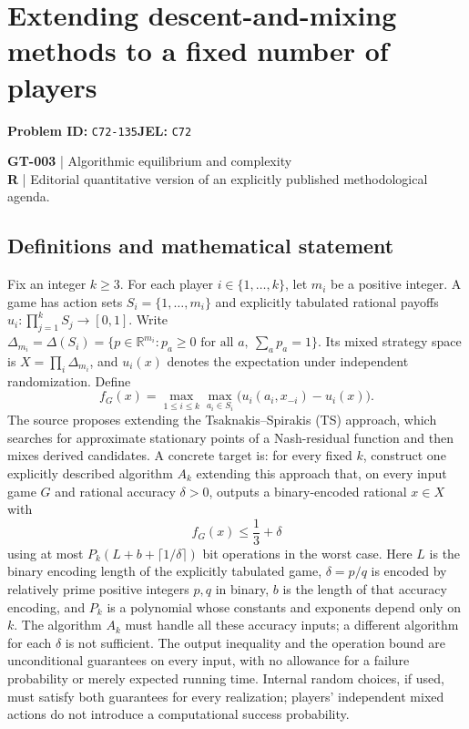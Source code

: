 \documentclass[11pt,a4paper]{article}
\newcommand{\R}{\mathbb R}
\begin{document}
\section*{Extending descent-and-mixing methods to a fixed number of players}
\textbf{Problem ID:} \texttt{C72-135}\quad \textbf{JEL:} \texttt{C72}\par
\label{problem:OP-0133}
\label{game:GT-003}
{\sffamily\small\color{muted}
\textbf{GT-003} | Algorithmic equilibrium and complexity\\
\textbf{R} | Editorial quantitative version of an explicitly published methodological agenda.
\par}
\subsection*{Definitions and mathematical statement}
Fix an integer $k\geq3$. For each player $i\in\{1,\ldots,k\}$, let $m_i$ be a positive integer. A game has action sets $S_i=\{1,\ldots,m_i\}$ and explicitly tabulated rational payoffs $u_i:\prod_{j=1}^kS_j\to[0,1]$. Write $\Delta_{m_i}=\Delta(S_i)=\{p\in\R^{m_i}:p_a\geq0\text{ for all }a,\ \sum_a p_a=1\}$. Its mixed strategy space is $X=\prod_i\Delta_{m_i}$, and $u_i(x)$ denotes the expectation under independent randomization. Define
\[
 f_G(x)=\max_{1\leq i\leq k}\max_{a_i\in S_i}
 \bigl(u_i(a_i,x_{-i})-u_i(x)\bigr).
\]
The source proposes extending the Tsaknakis--Spirakis (TS) approach, which searches for approximate stationary points of a Nash-residual function and then mixes derived candidates. A concrete target is: for every fixed $k$, construct one explicitly described algorithm $A_k$ extending this approach that, on every input game $G$ and rational accuracy $\delta>0$, outputs a binary-encoded rational $x\in X$ with
\[
 f_G(x)\leq \frac13+\delta
\]
using at most $P_k(L+b+\lceil1/\delta\rceil)$ bit operations in the worst case. Here $L$ is the binary encoding length of the explicitly tabulated game, $\delta=p/q$ is encoded by relatively prime positive integers $p,q$ in binary, $b$ is the length of that accuracy encoding, and $P_k$ is a polynomial whose constants and exponents depend only on $k$. The algorithm $A_k$ must handle all these accuracy inputs; a different algorithm for each $\delta$ is not sufficient. The output inequality and the operation bound are unconditional guarantees on every input, with no allowance for a failure probability or merely expected running time. Internal random choices, if used, must satisfy both guarantees for every realization; players' independent mixed actions do not introduce a computational success probability.
\end{document}
